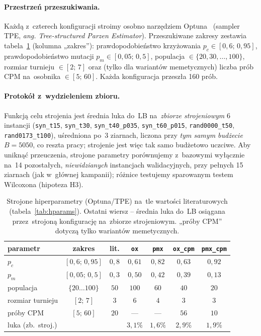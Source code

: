 \documentclass[pdflatex,sn-mathphys,Numbered]{sn-jnl}
\begin{document}
\paragraph{Przestrzeń przeszukiwania.} Każdą z~czterech konfiguracji stroimy
osobno narzędziem Optuna~\cite{akiba2019} (sampler TPE, \textit{ang.
Tree-structured Parzen Estimator}). Przeszukiwane zakresy zestawia
tabela~\ref{tab:tune} (kolumna „zakres''): prawdopodobieństwo krzyżowania
$p_c\in[0{,}6;\,0{,}95]$, prawdopodobieństwo mutacji $p_m\in[0{,}05;\,0{,}5]$,
populacja $\in\{20,30,\dots,100\}$, rozmiar turnieju $\in[2;\,7]$ oraz (tylko dla
wariantów memetycznych) liczba prób CPM na~osobnika $\in[5;\,60]$. Każda
konfiguracja przeszła 160 prób.

\paragraph{Protokół z~wydzieleniem zbioru.} Funkcją celu strojenia jest średnia
luka do~LB na~\emph{zbiorze strojeniowym} 6 instancji (\texttt{syn\_t15},
\texttt{syn\_t30}, \texttt{syn\_t40\_p035}, \texttt{syn\_t60\_p015},
\texttt{rand0000\_t50}, \texttt{rand0173\_t100}), uśredniona po~3 ziarnach, liczona
przy \emph{tym samym budżecie} $B=5050$, co reszta pracy; strojenie jest więc tak
samo budżetowo uczciwe. Aby uniknąć przeuczenia, strojone parametry porównujemy
z~bazowymi wyłącznie na~14 pozostałych, \emph{niewidzianych} instancjach
walidacyjnych, przy pełnych 15 ziarnach (jak w~głównej kampanii); różnice testujemy
sparowanym testem Wilcoxona (hipoteza H3).

\begin{table}[ht]
\centering\scriptsize\setlength{\tabcolsep}{5pt}
\begin{tabular}{lcccccc}
\toprule
parametr & zakres & lit. & \texttt{ox} & \texttt{pmx} & \texttt{ox\_cpm} & \texttt{pmx\_cpm} \\
\midrule
$p_c$ & $[0{,}6;\,0{,}95]$ & $0{,}8$ & $0{,}61$ & $0{,}82$ & $0{,}63$ & $0{,}92$ \\
$p_m$ & $[0{,}05;\,0{,}5]$ & $0{,}3$ & $0{,}50$ & $0{,}42$ & $0{,}39$ & $0{,}13$ \\
populacja & $\{20\dots100\}$ & $50$ & $100$ & $60$ & $40$ & $20$ \\
rozmiar turnieju & $[2;\,7]$ & $3$ & $6$ & $4$ & $3$ & $3$ \\
próby CPM & $[5;\,60]$ & $20$ & --- & --- & $56$ & $10$ \\
\midrule
luka (zb.\ stroj.) & & & $3{,}1\%$ & $1{,}6\%$ & $2{,}9\%$ & $1{,}9\%$ \\
\bottomrule
\end{tabular}
\caption{Strojone hiperparametry (Optuna/TPE) na~tle wartości literaturowych
(tabela~\ref{tab:hparams}). Ostatni wiersz -- średnia luka do~LB osiągana
przez~strojoną konfigurację na~zbiorze strojeniowym. „próby CPM'' dotyczą tylko
wariantów memetycznych.}
\label{tab:tune}
\end{table}
\end{document}

